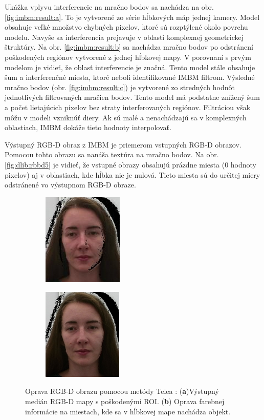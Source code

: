 Ukážka vplyvu interferencie na mračno bodov sa nachádza na obr. \ref{fig:imbm:result:a}. To je vytvorené zo série hĺbkových máp jednej kamery. Model obsahuje veľké množstvo chybných pixelov, ktoré sú rozptýlené okolo povrchu modelu. Navyše sa interferencia prejavuje v oblasti komplexnej geometrickej štruktúry. 
Na obr. \ref{fig:imbm:result:b} sa nachádza mračno bodov po odstránení poškodených regiónov vytvorené z jednej hĺbkovej mapy. V porovnaní s prvým modelom je vidieť, že oblasť interferencie je značná. Tento model stále obsahuje šum a interferenčné miesta, ktoré neboli identifikované IMBM filtrom.  
Výsledné mračno bodov (obr. \ref{fig:imbm:result:c}) je vytvorené zo stredných hodnôt jednotlivých filtrovaných mračien bodov. Tento model má podstatne znížený šum a počet lietajúcich pixelov bez straty interferovaných regiónov. Filtráciou však môžu v modeli vzniknúť diery. Ak sú malé a nenachádzajú sa v komplexných oblastiach, IMBM dokáže tieto hodnoty interpolovať. 

Výstupný RGB-D obraz z IMBM je priemerom vstupných RGB-D obrazov. Pomocou tohto obrazu sa nanáša textúra na mračno bodov. Na obr. \ref{fig:dlib:rbbd5} je vidieť, že vstupné obrazy obsahujú prázdne miesta (0 hodnoty pixelov) aj v oblastiach, kde hĺbka nie je nulová.
Tieto miesta sú do určitej miery odstránené vo výstupnom RGB-D obraze.


\begin{figure}[h]
	\centering
	\begin{subfigure}[b]{0.48\textwidth}
		\centering
		\includegraphics[height=4.4cm]{figures/inpaint_a.png}
		\caption{}
		\label{fig:inpaint:a}
	\end{subfigure}
	\hskip 0in
	\begin{subfigure}[b]{0.48\textwidth}
		\centering
		\includegraphics[height=4.4cm]{figures/inpaint_b.png}
		\caption{}
		\label{fig:inpaint:b}
	\end{subfigure}
	\caption{Oprava RGB-D obrazu pomocou metódy Telea : (\textbf{a})Výstupný  medián RGB-D mapy s poškodenými ROI. (\textbf{b}) Oprava farebnej informácie na miestach, kde sa v hĺbkovej mape nachádza objekt.}
	\label{fig:inpaint}
\end{figure}

